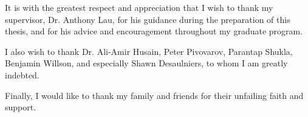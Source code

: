 It is with the greatest respect and appreciation that I wish to
thank my supervisor, Dr. Anthony Lau, for his guidance
during the preparation of this thesis, and for his advice
and encouragement throughout my graduate program.

I also wish to thank Dr. Ali-Amir Husain, Peter Pivovarov, Parantap 
Shukla, Benjamin Willson, and especially Shawn Desaulniers, to whom
I am greatly indebted.

Finally, I would like to thank my family and friends for their unfailing 
faith and support.
